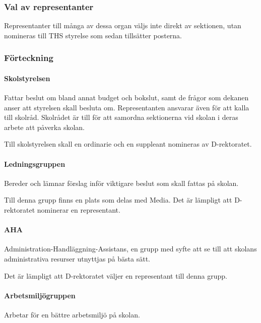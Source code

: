 \documentclass{dgovdoc}
\begin{document}
\subsubsection{Val av representanter}

Representanter till många av dessa organ väljs inte direkt av sektionen, utan
nomineras till THS styrelse som sedan tillsätter posterna.

\subsubsection{Förteckning}

\paragraph{Skolstyrelsen}

Fattar beslut om bland annat budget och bokslut, samt de frågor som dekanen
anser att styrelsen skall besluta om. Representanten ansvarar även för att
kalla till skolråd. Skolrådet är till för att samordna sektionerna vid skolan i
deras arbete att påverka skolan.

Till skolstyrelsen skall en ordinarie och en suppleant nomineras av
D-rektoratet.

\paragraph{Ledningsgruppen}

Bereder och lämnar förslag inför viktigare beslut som skall fattas på skolan.

Till denna grupp finns en plats som delas med Media. Det är lämpligt att
D-rektoratet nominerar en representant.

\paragraph{AHA}

Administration-Handläggning-Assistans, en grupp med syfte att se till att
skolans administrativa resurser utnyttjas på bästa sätt.

Det är lämpligt att D-rektoratet väljer en representant till denna grupp.

\paragraph{Arbetsmiljögruppen}

Arbetar för en bättre arbetsmiljö på skolan.
\end{document}

